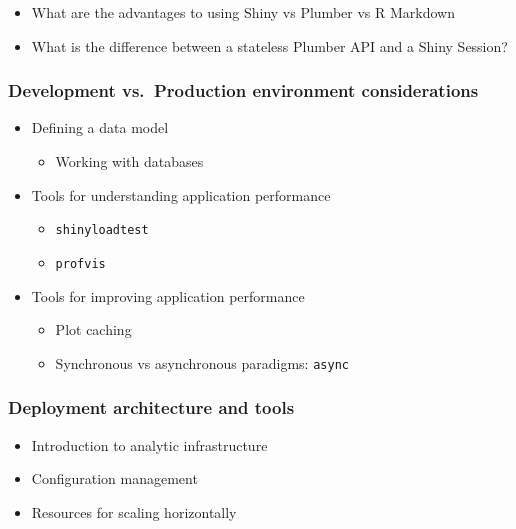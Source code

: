 \documentclass[]{book}
\providecommand{\tightlist}{%
  \setlength{\itemsep}{0pt}\setlength{\parskip}{0pt}}
\theoremstyle{definition}
\theoremstyle{definition}
\theoremstyle{definition}
\theoremstyle{remark}
\begin{document}
\begin{itemize}
\tightlist
\item
  What are the advantages to using Shiny vs Plumber vs R Markdown
\item
  What is the difference between a stateless Plumber API and a Shiny
  Session?
\end{itemize}

\hypertarget{development-vs.production-environment-considerations}{%
\subsubsection{Development vs.~Production environment
considerations}\label{development-vs.production-environment-considerations}}

\begin{itemize}
\tightlist
\item
  Defining a data model

  \begin{itemize}
  \tightlist
  \item
    Working with databases
  \end{itemize}
\item
  Tools for understanding application performance

  \begin{itemize}
  \tightlist
  \item
    \texttt{shinyloadtest}
  \item
    \texttt{profvis}
  \end{itemize}
\item
  Tools for improving application performance

  \begin{itemize}
  \tightlist
  \item
    Plot caching
  \item
    Synchronous vs asynchronous paradigms: \texttt{async}
  \end{itemize}
\end{itemize}

\hypertarget{deployment-architecture-and-tools}{%
\subsubsection{Deployment architecture and
tools}\label{deployment-architecture-and-tools}}

\begin{itemize}
\tightlist
\item
  Introduction to analytic infrastructure
\item
  Configuration management
\item
  Resources for scaling horizontally
\end{itemize}
\end{document}
